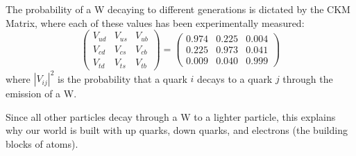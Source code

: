 The probability of a W decaying to different generations is dictated by the CKM Matrix, where each of these values has been experimentally measured:
\begin{equation}\label{Eq:CKM}
    \left(\begin{array}{c} V_{ud}\\V_{cd}\\V_{td} \end{array}\begin{array}{c}  V_{us}\\V_{cs}\\V_{ts} \end{array}\begin{array}{c} V_{ub}\\V_{cb}\\V_{tb}  \end{array}\right) = \left(\begin{array}{c} 0.974\\0.225\\0.009 \end{array}\begin{array}{c}  0.225\\0.973\\0.040 \end{array}\begin{array}{c} 0.004\\0.041\\0.999  \end{array}\right)
\end{equation}
where $|V_{ij}|^2$ is the probability that a quark $i$ decays to a quark $j$ through the emission of a W.

Since all other particles decay through a W to a lighter particle, this explains why our world is built with up quarks, down quarks, and electrons (the building blocks of atoms). 

